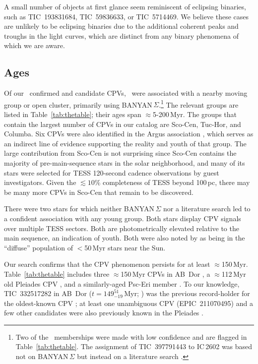 \documentclass[11pt,twocolumn,tighten]{aastex63}
\begin{document}
A small number of objects at first glance seem reminiscent of
eclipsing binaries, such as TIC~193831684, TIC~59836633, or
TIC~5714469.  We believe these cases are unlikely to be eclipsing
binaries due to the additional coherent peaks and troughs in the light
curves, which are distinct from any binary phenomena of which we are
aware.



\subsection{Ages}

Of our \ncqvsnodebunked\ confirmed and candidate CPVs,
\nnotfieldbanyan\ were associated with a nearby moving group or open
cluster, primarily using BANYAN\,$\Sigma$.\footnote{Two of the
\nnotfieldbanyan\ memberships were made with low confidence and are
flagged in Table~\ref{tab:thetable}.  The assignment of TIC~397791443
to IC\,2602 was based not on BANYAN\,$\Sigma$ but instead on a
literature search \citep[e.g.][]{2020A&A...633A..99C}.}  The relevant
groups are listed in Table~\ref{tab:thetable}; their ages span
$\approx$5-200\,Myr.  The groups that contain the largest number of
CPVs in our catalog are Sco-Cen, Tuc-Hor, and Columba.  Six CPVs were
also identified in the Argus association \citep{2019ApJ...870...27Z},
which serves as an indirect line of evidence supporting the reality
and youth of that group.  The large contribution from Sco-Cen is not
surprising since Sco-Cen contains the majority of pre-main-sequence
stars in the solar neighborhood, and many of its stars were selected
for TESS 120-second cadence observations by guest investigators.
Given the $\lesssim$$10\%$ completeness of TESS beyond 100\,pc, there
may be many more CPVs in Sco-Cen that remain to be discovered.

There were two stars for which neither BANYAN\,$\Sigma$ nor a
literature search led to a confident association with any young group.
Both stars display CPV signals over multiple TESS sectors. Both are
photometrically elevated relative to the main sequence, an indication
of youth.  Both were also noted by \citet{2021ApJ...917...23K} as
being in the ``diffuse'' population of $<$50\,Myr stars near the Sun.

Our search confirms that the CPV phenomenon persists for at least
$\approx$150\,Myr.  Table~\ref{tab:thetable} includes three
$\approx$150\,Myr CPVs in AB~Dor \citep{2015MNRAS.454..593B}, a
$\approx$112\,Myr old Pleiades CPV \citep{2015ApJ...813..108D}, and a
similarly-aged Psc-Eri member \citep{2020A&A...639A..64R}.  To our
knowledge, TIC~332517282 in AB~Dor ($t$$=$$149^{51}_{-19}$\,Myr;
\citealt{2015MNRAS.454..593B}) was the previous record-holder for the
oldest-known CPV \citep{2019ApJ...876..127Z,2022AJ....163..144G}; at
least one unambiguous CPV (EPIC~211070495) and a few other candidates
were also previously known in the Pleiades
\citep{2016AJ....152..114R}.  
\end{document}

